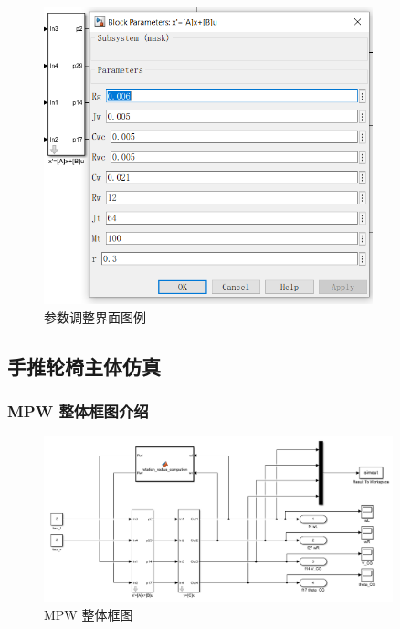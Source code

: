 \begin{itemize}
	\begin{figure}[H]
		\centering
		\includegraphics[width=0.85\textwidth]{fig/simulink/block_params.png}
		\caption{参数调整界面图例}\label{fig:block_params}
	\end{figure}
	
	\clearpage
	
	\subsection{手推轮椅主体仿真}
	
	\subsubsection{MPW 整体框图介绍}
	
	\begin{figure}[htbp]
		\centering
		\includegraphics[width=0.9\textwidth]{fig/simulink/MPW_simulink1.png}
		\caption{MPW 整体框图}\label{fig:MPW_simulink}
	\end{figure}
	

\end{itemize}

